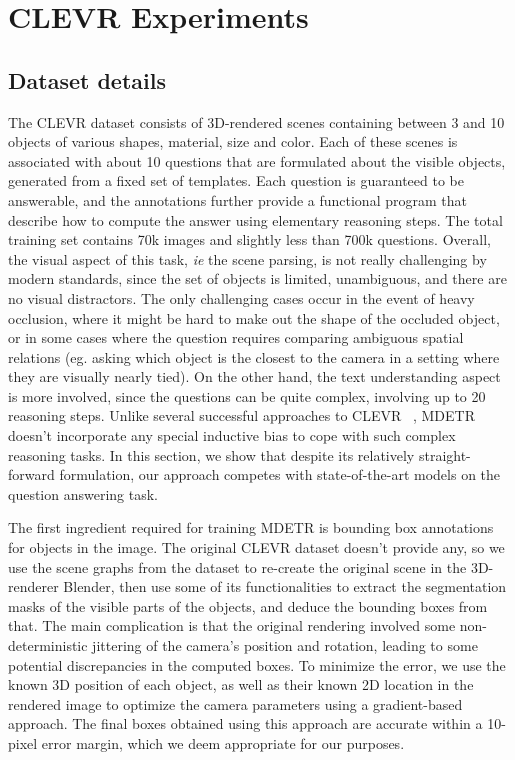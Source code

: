 \section{CLEVR Experiments}
\label{appendix_section:CLEVR_results_detailed}
\subsection{Dataset details}
\label{sec:clevr_dataset_details}
The CLEVR dataset consists of 3D-rendered scenes containing between 3 and 10 objects of various shapes, material, size and color. Each of these scenes is associated with about 10 questions that are formulated about the visible objects, generated from a fixed set of templates. Each question is guaranteed to be answerable, and the annotations further provide a functional program that describe how to compute the answer using elementary reasoning steps. The total training set contains 70k images and slightly less than 700k questions. Overall, the visual aspect of this task, \emph{ie} the scene parsing, is not really challenging by modern standards, since the set of objects is limited, unambiguous, and there are no visual distractors. The only challenging cases occur in the event of heavy occlusion, where it might be hard to make out the shape of the occluded object, or in some cases where the question requires comparing ambiguous spatial relations (eg. asking which object is the closest to the camera in a setting where they are visually nearly tied). On the other hand, the text understanding aspect is more involved, since the questions can be quite complex, involving up to 20 reasoning steps.
Unlike several successful approaches to CLEVR~\cite{johnson_inferring_2017, Hudson2018CompositionalAN, mascharkaTransparencyDesignClosing2018, yiNeuralSymbolicVQADisentangling2019} , MDETR doesn't incorporate any special inductive bias to cope with such complex reasoning tasks. In this section, we show that despite its relatively straight-forward formulation, our approach competes with state-of-the-art models on the question answering task.

The first ingredient required for training MDETR is bounding box annotations for objects in the image. The original CLEVR dataset doesn't provide any, so we use the scene graphs from the dataset to re-create the original scene in the 3D-renderer Blender, then use some of its functionalities to extract the segmentation masks of the visible parts of the objects, and deduce the bounding boxes from that. The main complication is that the original rendering involved some non-deterministic jittering of the camera's position and rotation, leading to some potential discrepancies in the computed boxes. To minimize the error, we use the known 3D position of each object, as well as their known 2D location in the rendered image to optimize the camera parameters using a gradient-based approach. The final boxes obtained using this approach are accurate within a 10-pixel error margin, which we deem appropriate for our purposes.

